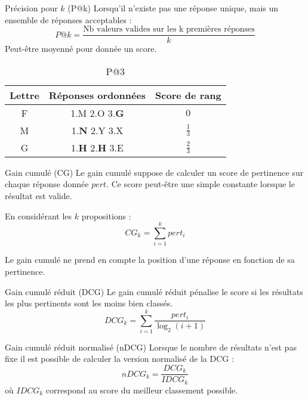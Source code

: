 \begin{frame}{Précision pour $k$ (P@k)}
  Lorsqu'il n'existe pas une réponse unique, mais un ensemble de réponses acceptables :
  \begin{equation*}
    P@ k = \frac{\text{Nb valeurs valides sur les k premières réponses}}{k}
  \end{equation*}
  Peut-être moyenné pour donnée un score.
  \begin{table}
    \centering
    \begin{tabular}{c|c|c}
      \toprule
      Lettre & Réponses ordonnées & Score de rang\\
      \midrule
      F & 1.M 2.O 3.\textbf{G} & $0$\\
      M & 1.\textbf{N} 2.Y 3.X & $\frac{1}{3}$\\
      G & 1.\textbf{H} 2.\textbf{H} 3.E & $\frac{2}{3}$\\
      \bottomrule
    \end{tabular}
    \caption{P@3}
  \end{table}
\end{frame}

\begin{frame}{Gain cumulé (CG)}
  Le gain cumulé suppose de calculer un score de pertinence sur chaque réponse donnée $pert$. Ce score peut-être une simple constante lorsque le résultat est valide.

  En considérant les $k$ propositions :
  \begin{equation*}
    CG_k=\sum^k_{i=1} pert_i
  \end{equation*}

  Le gain cumulé ne prend en compte la position d'une réponse en fonction de sa pertinence.
\end{frame}

\begin{frame}{Gain cumulé réduit (DCG)}
  Le gain cumulé réduit pénalise le score si les résultats les plus pertinents sont les moins bien classés.
  \begin{equation*}
    DCG_k=\sum^k_{i=1} \frac{pert_i}{\log_2(i+1)} 
  \end{equation*}
\end{frame}

\begin{frame}{Gain cumulé réduit normalisé (nDCG)}
  Lorsque le nombre de résultats n'est pas fixe il est possible de calculer la version normalisé de la DCG :
  \begin{equation*}
    nDCG_k=\frac{DCG_k}{IDCG_k}
  \end{equation*}
  où $IDCG_k$ correspond au score du meilleur classement possible.
\end{frame}


